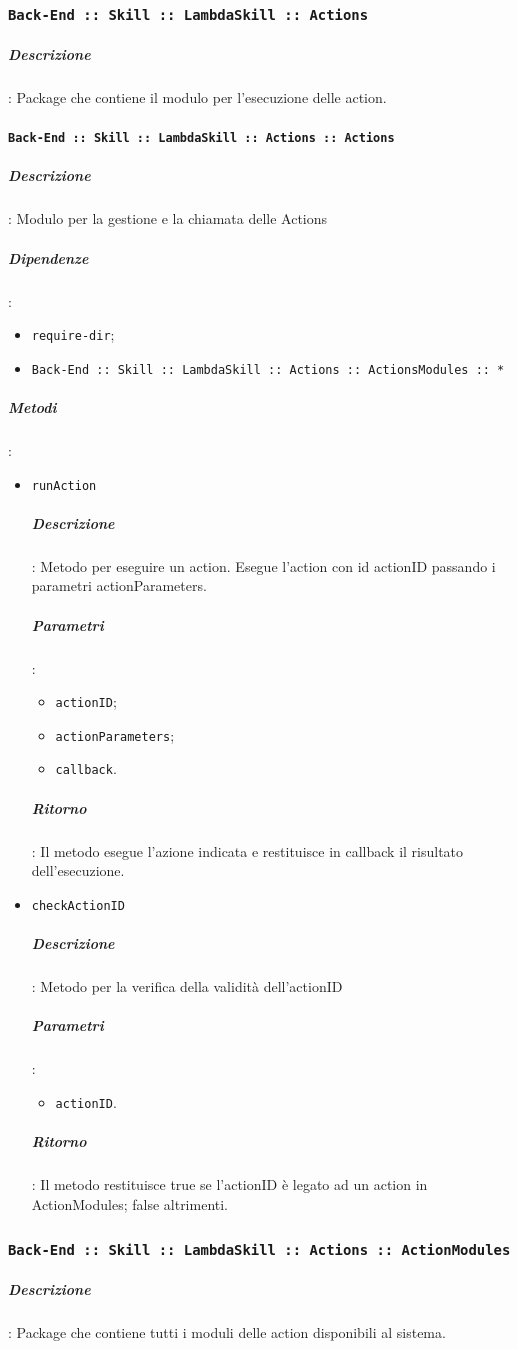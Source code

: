 \documentclass[../DefinizioneDiProdotto_v3.0.0.tex]{subfiles}
\begin{document}
\subsubsection{\texttt{Back-End :: Skill :: LambdaSkill :: Actions}}
\subparagraph{Descrizione}: Package che contiene il modulo per l'esecuzione delle action.

\paragraph{\texttt{Back-End :: Skill :: LambdaSkill :: Actions :: Actions}}
\subparagraph{Descrizione}: Modulo per la gestione e la chiamata delle Actions
\subparagraph{Dipendenze}:
\begin{itemize}
	\item \texttt{require-dir};
	\item \texttt{Back-End :: Skill :: LambdaSkill :: Actions :: ActionsModules :: *}
\end{itemize}
\subparagraph{Metodi}:
\begin{itemize}
	\item \texttt{runAction}
	      \subparagraph{Descrizione}: Metodo per eseguire un action. Esegue l'action con id actionID passando i parametri actionParameters.
	      \subparagraph{Parametri}:
	      \begin{itemize}
	      	\item \texttt{actionID};
	      	\item \texttt{actionParameters};
	      	\item \texttt{callback}.
	      \end{itemize}
	      \subparagraph{Ritorno}: Il metodo esegue l'azione indicata e restituisce in callback il risultato dell'esecuzione.
	\item \texttt{checkActionID}
	      \subparagraph{Descrizione}: Metodo per la verifica della validità dell'actionID
	      \subparagraph{Parametri}:
	      \begin{itemize}
	      	\item \texttt{actionID}.
	      \end{itemize}
	      \subparagraph{Ritorno}: Il metodo restituisce true se l'actionID è legato ad un action in ActionModules; false altrimenti.
\end{itemize}

\subsubsection{\texttt{Back-End :: Skill :: LambdaSkill :: Actions :: ActionModules}}
\subparagraph{Descrizione}:
Package che contiene tutti i moduli delle action disponibili al sistema.
\end{document}
